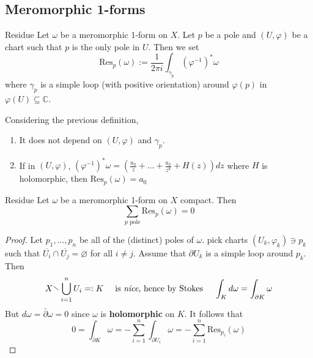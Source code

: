\subsection{Meromorphic 1-forms}
\begin{definition}{Residue}
    Let \(\omega\) be a meromorphic 1-form on \(X\). Let \(p\) be a pole and
    \({(U, \varphi )}\) be a chart such that \(p\) is the only pole in \(U\).
    Then we set \[\mathrm{Res}_p {(\omega)} := \frac{1}{2\pi i} \int_{\gamma_p} {\left(
    \varphi ^{-1} \right)}^{*} \omega\] where \(\gamma_p\) is a simple loop
    (with positive orientation) around \(\varphi {(p)}\) in \(\varphi {(U)}
    \subseteq \mathbb{C} \).
\end{definition}
\begin{proposition} Considering the previous definition,
\begin{enumerate}[label = \arabic*.]
    \item It does not depend on \({(U, \varphi )}\) and \(\gamma_p\).
    \item If in \({(U, \varphi )}\), \({(\varphi ^{-1})}^{*} \omega = {\left(
        \frac{a_{0}}{z} + \dots + \frac{a_k}{z^{k}} + H{(z)}\right)} dz\) where
        \(H\) is holomorphic, then \(\mathrm{Res}_p{(\omega)} = a_{0}\) 
\end{enumerate}
\end{proposition}

\begin{theorem}{Residue}
    Let \(\omega\) be a meromorphic 1-form on \(X\) compact. Then 
    \[
      \sum_{p \text{ pole}} \mathrm{Res}_p{(\omega)} = 0
    \]
\end{theorem}

\begin{proof}{}
    Let \(p_{1}, \dots, p_{n}\) be all of the (distinct) poles of \(\omega\).
    pick charts \({(U_k, \varphi_k)} \ni p_k\) such that \(\overline{U_{i}} \cap
    \overline{U_{j}} = \varnothing\) for all \(i \neq j\). Assume that
    \(\partial U_k\) is a simple loop around \(p_k\). Then
    \[
      X \sminus \bigcup_{i=1} ^{n} U_{i} =: K
      \quad \text{ is \emph{nice}, hence by Stokes }\quad
      \int_K d \omega = \int_{\partial K} \omega
    \]
    But \(d\omega = \bar{\partial} \omega = 0\) since \(\omega\) is
    \textbf{holomorphic} on \(K\). It follows that
    \[
      0 = \int_{\partial K} \omega = - \sum_{i=1}^{n} \int_{\partial U_{i}}
      \omega = - \sum_{i=1}^{n} \mathrm{Res}_{p_{i}} {(\omega)} 
    \]
\end{proof}

